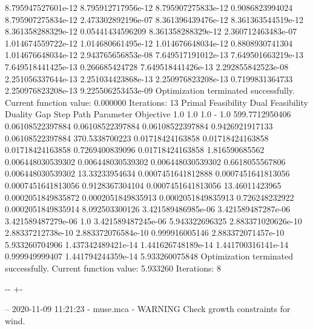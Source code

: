 \documentclass[letterpaper,10pt,english]{sphinxmanual}
\newlength\nbsphinxcodecellspacing
\begin{document}
{\begin{sphinxVerbatim}[commandchars=\\\{\}]
8.795947527601e-12  8.795912717956e-12  8.795907275833e-12  0.9086823994024  8.795907275834e-12  2.473302892196e-07
8.361396439476e-12  8.361363544519e-12  8.361358288329e-12  0.05441434596209 8.361358288329e-12  2.360712463483e-07
1.014674559722e-12  1.014680661495e-12  1.014676648034e-12  0.8808930741304  1.014676648034e-12  2.943765656853e-08
7.649517191012e-13  7.649501663219e-13  7.649518441425e-13  0.266685424728   7.649518441426e-13  2.292855842523e-08
2.251056337644e-13  2.251034423868e-13  2.250976823208e-13  0.7199831364733  2.250976823208e-13  9.225506253453e-09
Optimization terminated successfully.
         Current function value: 0.000000
         Iterations: 13
Primal Feasibility  Dual Feasibility    Duality Gap         Step             Path Parameter      Objective
1.0                 1.0                 1.0                 -                1.0                 599.7712950406
0.06108522397884    0.06108522397884    0.06108522397884    0.9426921917133  0.06108522397884    370.5338700223
0.01718424163858    0.01718424163858    0.01718424163858    0.7269400839096  0.01718424163858    1.816590685562
0.006448030539302   0.006448030539302   0.006448030539302   0.6618055567806  0.006448030539302   13.33233954634
0.0007451641812888  0.0007451641813056  0.0007451641813056  0.9128367304104  0.0007451641813056  13.46011423965
0.0002051849835872  0.0002051849835913  0.0002051849835913  0.726248232922   0.0002051849835914  8.092503300126
3.421589486985e-06  3.421589487287e-06  3.421589487279e-06  1.0              3.421589487245e-06  5.943322696325
2.883371020626e-10  2.88337212738e-10   2.883372076584e-10  0.999916005146   2.883372071457e-10  5.933260704906
1.437342489421e-14  1.441626748189e-14  1.441700316141e-14  0.999949999407   1.441794244359e-14  5.933260075848
Optimization terminated successfully.
         Current function value: 5.933260
         Iterations: 8
\end{sphinxVerbatim}
}

{

\kern-\sphinxverbatimsmallskipamount\kern-\baselineskip
\kern+\FrameHeightAdjust\kern-\fboxrule
\vspace{\nbsphinxcodecellspacing}

\begin{sphinxVerbatim}[commandchars=\\\{\}]
-- 2020-11-09 11:21:23 - muse.mca - WARNING
Check growth constraints for wind.

\end{sphinxVerbatim}
}
\end{document}
